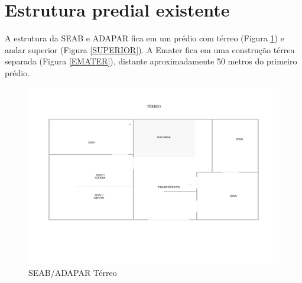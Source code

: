 \documentclass[	DIV=calc,%
							paper=a4,%
							fontsize=12pt,%
							onecolumn]{scrartcl}	 					%
\begin{document}
\section{Estrutura predial existente}
A estrutura da SEAB e ADAPAR fica em um prédio com térreo (Figura \ref{TERREO}) e andar superior (Figura \ref{SUPERIOR}). A Emater fica em uma construção térrea separada (Figura \ref{EMATER}), distante aproximadamente 50 metros do primeiro prédio.

\begin{figure}[H]
	\centering
	\includegraphics[height=\textwidth,width=25cm,angle=-90,keepaspectratio]{TERREO}
	\caption{SEAB/ADAPAR Térreo}
	\label{TERREO}	
\end{figure}
\end{document}
